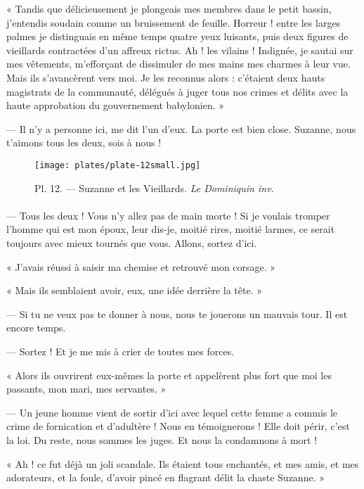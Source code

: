\documentclass[a4paper, 11pt, oneside, polutonikogreek, french]{article}
\begin{document}
« Tandis que délicieusement je plongeais mes membres dans le petit bassin, j'entendis soudain comme un bruissement de feuille. Horreur ! entre les larges palmes je distinguais en même temps quatre yeux luisants, puis deux figures de vieillards contractées d'un affreux rictus. Ah ! les vilains ! Indignée, je sautai sur mes vêtements, m'efforçant de dissimuler de mes mains mes charmes à leur vue. Mais ils s'avancèrent vers moi. Je les reconnus alors : c'étaient deux hauts magistrats de la communauté, délégués à juger tous nos crimes et délits avec la haute approbation du gouvernement babylonien. »

--- Il n'y a personne ici, me dit l'un d'eux. La porte est bien close. Suzanne, nous t'aimons tous les deux, sois à nous !
\clearpage
\vspace*{\fill}
\begin{figure}[H]
\centering
\texttt{[image: plates/plate-12small.jpg]}
\caption{\Fontauri Pl. 12. --- Suzanne et les Vieillards. \emph{Le Dominiquin inv.}}
\end{figure}
\vspace*{\fill}
\clearpage
\paragraph{}
--- Tous les deux ! Vous n'y allez pas de main morte ! Si je voulais tromper l'homme qui est mon époux, leur dis-je, moitié rires, moitié larmes, ce serait toujours avec mieux tournés que vous. Allons, sortez d'ici.

« J'avais réussi à saisir ma chemise et retrouvé mon corsage. »

« Mais ils semblaient avoir, eux, une idée derrière la tête. »

--- Si tu ne veux pas te donner à nous, nous te jouerons un mauvais tour. Il est encore temps.

--- Sortez ! Et je me mis à crier de toutes mes forces.

« Alors ils ouvrirent eux-mêmes la porte et appelèrent plus fort que moi les passants, mon mari, mes servantes. »

--- Un jeune homme vient de sortir d'ici avec lequel cette femme a commis le crime de fornication et d'adultère ! Nous en témoignerons ! Elle doit périr, c'est la loi. Du reste, nous sommes les juges. Et nous la condamnons à mort !

« Ah ! ce fut déjà un joli scandale. Ils étaient tous enchantés, et mes amis, et mes adorateurs, et la foule, d'avoir pincé en flagrant délit la chaste Suzanne. »
\end{document}
